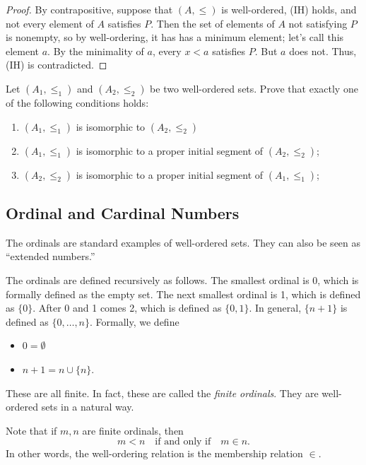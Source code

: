 \begin{proof}
  By contrapositive, suppose that $(A,\le)$ is well-ordered, (IH) holds, and not every element of $A$ satisfies $P$.
  Then the set of elements of $A$ not satisfying $P$ is nonempty, so by well-ordering, it has has a minimum element;
  let’s call this element $a$.
  By the minimality of $a$, every $x<a$ satisfies $P$.
  But $a$ does not.
  Thus, (IH) is contradicted.
\end{proof}

\begin{exercise}
Let $(A_1, \le_1)$ and $(A_2, \le_2)$ be two well-ordered sets. Prove that exactly one of the following conditions holds:
\begin{enumerate}
    \item $(A_1, \le_1)$ is isomorphic to $(A_2, \le_2)$
    \item $(A_1, \le_1)$ is isomorphic to a proper initial segment of $(A_2, \le_2)$;
    \item $(A_2, \le_2)$ is isomorphic to a proper initial segment of $(A_1, \le_1)$;
\end{enumerate}
\end{exercise}

\subsection{Ordinal and Cardinal Numbers \nopunct} \phantom{period}
\label{sec:ordinals-cardinals}

The ordinals are standard examples of well-ordered sets.
They can also be seen as “extended numbers.”

The ordinals are defined recursively as follows.
The smallest ordinal is 0, which is formally defined as the empty set.
The next smallest ordinal is 1, which is defined as $\{0\}$.
After 0 and 1 comes 2, which is defined as $\{0,1\}$.
In general, $\{n+1\}$ is defined as $\{0,\dots, n\}$.
Formally, we define

\begin{itemize}
\item
  $0=\emptyset$
\item
  $n+1=n\cup\{n\}$.
\end{itemize}

These are all finite.
In fact, these are called the \emph{finite ordinals}.
They are well-ordered sets  in a natural way.

Note that if $m,n$ are finite ordinals, then
\[
  m<n
  \quad\text{if and only if} \quad
  m\in n.
\]
In other words, the well-ordering relation is the membership relation $\in$.

